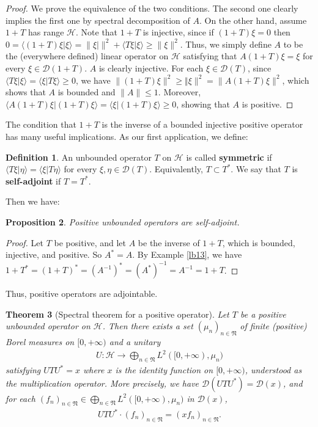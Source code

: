 \documentclass[12pt,a4paper,notitlepage]{article}
\theoremstyle{definition}
\newtheorem{df}{Definition}[section]
\theoremstyle{plain}
\newtheorem{thm}[df]{Theorem}
\newtheorem{pp}[df]{Proposition}
\newcommand{\fk}{\mathfrak}
\newcommand{\mc}{\mathcal}
\newcommand{\Dom}{\scr D}
\newcommand{\bk}[1]{\langle {#1}\rangle}
\newcommand{\scr}{\mathscr}
\numberwithin{equation}{section}
\begin{document}
\begin{proof}
We prove the equivalence of the two conditions. The second one clearly implies the first one by spectral decomposition of $A$. On the other hand, assume $1+T$ has range $\mc H$. Note that $1+T$ is injective, since if $(1+T)\xi=0$ then $0=\bk{(1+T)\xi|\xi}=\lVert\xi|\lVert^2+\bk{T\xi|\xi}\geq \lVert\xi\lVert^2$. Thus, we simply define $A$ to be the (everywhere defined) linear operator on $\mc H$ satisfying that $A(1+T)\xi=\xi$ for every $\xi\in\Dom(1+T)$. $A$ is clearly injective. For each $\xi\in\Dom(T)$, since $\bk{T\xi|\xi}=\bk{\xi|T\xi}\geq 0$, we have $\lVert (1+T)\xi\lVert^2\geq \Vert\xi\lVert^2=\lVert A(1+T)\xi\lVert^2$, which shows that $A$ is bounded and $\lVert A\lVert\leq 1$. Moreover, $\bk{A(1+T)\xi|(1+T)\xi}=\bk{\xi|(1+T)\xi}\geq 0$, showing that $A$ is positive.
\end{proof}



The condition that $1+T$ is the inverse of a bounded injective positive operator has many useful implications. As our first application, we define: 


\begin{df}
An  unbounded operator $T$ on $\mc H$ is called \textbf{symmetric} if $\bk{T\xi|\eta}=\bk{\xi|T\eta}$ for every $\xi,\eta\in\Dom(T)$. Equivalently, $T\subset T^*$. We say that $T$ is \textbf{self-adjoint} if $T=T^*$.
\end{df}

Then we have:
\begin{pp}\label{lb20}
Positive unbounded operators are self-adjoint.
\end{pp}

\begin{proof}
Let $T$ be positive, and let $A$ be the inverse of $1+T$, which is bounded, injective, and positive. So $A^*=A$. By Example \ref{lb13}, we have $1+T^*=(1+T)^*=(A^{-1})^*=(A^*)^{-1}=A^{-1}=1+T$.
\end{proof}



Thus, positive operators are adjointable.




\begin{thm}[Spectral theorem for a positive operator]\label{lb14}
Let $T$ be a positive unbounded operator on $\mc H$. Then there exists a set $(\mu_n)_{n\in\fk N}$ of finite (positive) Borel measures on $[0,+\infty)$ and a unitary
\begin{align*}
	U:\mc H\rightarrow\bigoplus_{n\in\fk N} L^2([0,+\infty),\mu_n)
\end{align*}
satisfying $UTU^*=x$ where $x$ is the identity function on $[0,+\infty)$, understood as the multiplication operator. More precisely, we have $\Dom(UTU^*)=\Dom(x)$, and for  each $(f_n)_{n\in\fk N}\in \bigoplus_{n\in\fk N} L^2([0,+\infty),\mu_n)$ in $\Dom(x)$,
\begin{align*}
	UTU^*\cdot (f_n)_{n\in\fk N}=(xf_n)_{n\in\fk N}.
\end{align*}
\end{thm}
\end{document}
